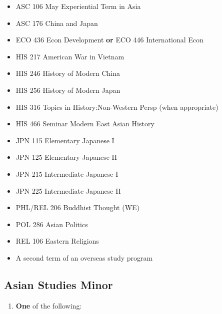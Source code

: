 \documentclass[
  letterpaper,
]{scrbook}
\providecommand{\tightlist}{%
  \setlength{\itemsep}{0pt}\setlength{\parskip}{0pt}}
\begin{document}
\begin{itemize}
\tightlist
\item
  ASC 106 May Experiential Term in Asia\\
\item
  ASC 176 China and Japan\\
\item
  ECO 436 Econ Development \textbf{or} ECO 446 International Econ\\
\item
  HIS 217 American War in Vietnam\\
\item
  HIS 246 History of Modern China\\
\item
  HIS 256 History of Modern Japan\\
\item
  HIS 316 Topics in History:Non-Western Persp (when appropriate)\\
\item
  HIS 466 Seminar Modern East Asian History\\
\item
  JPN 115 Elementary Japanese I\\
\item
  JPN 125 Elementary Japanese II\\
\item
  JPN 215 Intermediate Japanese I\\
\item
  JPN 225 Intermediate Japanese II\\
\item
  PHL/REL 206 Buddhist Thought (WE)\\
\item
  POL 286 Asian Politics\\
\item
  REL 106 Eastern Religions\\
\item
  A second term of an overseas study program
\end{itemize}

\subsection{Asian Studies Minor}\label{asian-studies-minor}

\begin{enumerate}
\def\labelenumi{\arabic{enumi}.}
\tightlist
\item
  \textbf{One} of the following:
\end{enumerate}
\end{document}

